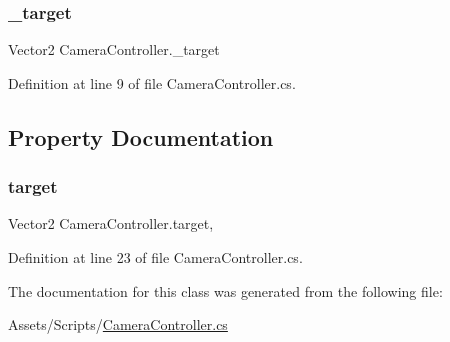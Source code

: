 \subsubsection{\texorpdfstring{\_target}{\_target}}
{\footnotesize\ttfamily Vector2 Camera\+Controller.\+\_\+target}



Definition at line 9 of file Camera\+Controller.\+cs.



\subsection{Property Documentation}
\mbox{\label{class_camera_controller_a1557d6d0a4b70b6bb53f5a913329d0d0}} 
\subsubsection{\texorpdfstring{target}{target}}
{\footnotesize\ttfamily Vector2 Camera\+Controller.\+target\hspace{0.3cm}{\ttfamily [get]}, {\ttfamily [set]}}



Definition at line 23 of file Camera\+Controller.\+cs.



The documentation for this class was generated from the following file\+:\begin{DoxyCompactItemize}
\item 
Assets/\+Scripts/\mbox{\hyperlink{_camera_controller_8cs}{Camera\+Controller.\+cs}}\end{DoxyCompactItemize}
